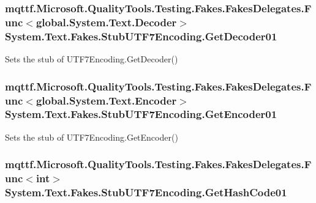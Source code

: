 \hypertarget{class_system_1_1_text_1_1_fakes_1_1_stub_u_t_f7_encoding_a88ff163da3f74ae17e7c7ccba80b0692}{
\subsubsection[{Get\-Decoder01}]{\setlength{\rightskip}{0pt plus 5cm}mqttf.\-Microsoft.\-Quality\-Tools.\-Testing.\-Fakes.\-Fakes\-Delegates.\-Func$<$global.\-System.\-Text.\-Decoder$>$ System.\-Text.\-Fakes.\-Stub\-U\-T\-F7\-Encoding.\-Get\-Decoder01}}\label{class_system_1_1_text_1_1_fakes_1_1_stub_u_t_f7_encoding_a88ff163da3f74ae17e7c7ccba80b0692}


Sets the stub of U\-T\-F7\-Encoding.\-Get\-Decoder()

\hypertarget{class_system_1_1_text_1_1_fakes_1_1_stub_u_t_f7_encoding_a44f13c8196a71b73db98dc5e492024d1}{
\subsubsection[{Get\-Encoder01}]{\setlength{\rightskip}{0pt plus 5cm}mqttf.\-Microsoft.\-Quality\-Tools.\-Testing.\-Fakes.\-Fakes\-Delegates.\-Func$<$global.\-System.\-Text.\-Encoder$>$ System.\-Text.\-Fakes.\-Stub\-U\-T\-F7\-Encoding.\-Get\-Encoder01}}\label{class_system_1_1_text_1_1_fakes_1_1_stub_u_t_f7_encoding_a44f13c8196a71b73db98dc5e492024d1}


Sets the stub of U\-T\-F7\-Encoding.\-Get\-Encoder()

\hypertarget{class_system_1_1_text_1_1_fakes_1_1_stub_u_t_f7_encoding_ae766defe3aacfd960eea23d5e82c710f}{
\subsubsection[{Get\-Hash\-Code01}]{\setlength{\rightskip}{0pt plus 5cm}mqttf.\-Microsoft.\-Quality\-Tools.\-Testing.\-Fakes.\-Fakes\-Delegates.\-Func$<$int$>$ System.\-Text.\-Fakes.\-Stub\-U\-T\-F7\-Encoding.\-Get\-Hash\-Code01}}\label{class_system_1_1_text_1_1_fakes_1_1_stub_u_t_f7_encoding_ae766defe3aacfd960eea23d5e82c710f}



